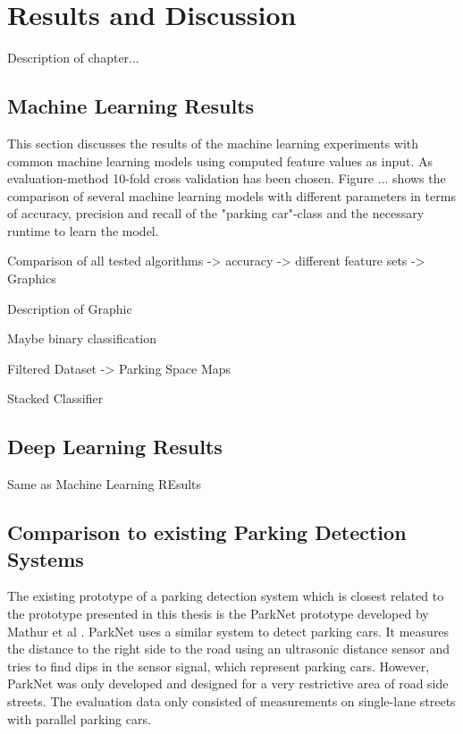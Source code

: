 \chapter{Results and Discussion}
\label{chap:evaluation}

Description of chapter...



\section{Machine Learning Results}

This section discusses the results of the machine learning experiments with common machine learning models using computed feature values as input. As evaluation-method 10-fold cross validation has been chosen. Figure ... shows the comparison of several machine learning models with different parameters in terms of accuracy, precision and recall of the "parking car"-class and the necessary runtime to learn the model.




Comparison of all tested algorithms -> accuracy -> different feature sets -> Graphics

Description of Graphic

Maybe binary classification

Filtered Dataset -> Parking Space Maps

Stacked Classifier


\section{Deep Learning Results}

Same as Machine Learning REsults





\section{Comparison to existing Parking Detection Systems}

The existing prototype of a parking detection system which is closest related to the prototype presented in this thesis is the ParkNet prototype developed by Mathur et al \cite{Mathur:2010:PDS:1814433.1814448}. ParkNet uses a similar system to detect parking cars. It measures the distance to the right side to the road using an ultrasonic distance sensor and tries to find dips in the sensor signal, which represent parking cars. However, ParkNet was only developed and designed for a very restrictive area of road side streets. The evaluation data only consisted of measurements on single-lane streets with parallel parking cars. 

